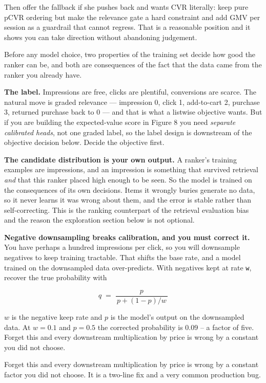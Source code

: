 \documentclass[10pt,twoside]{book}
\newcommand{\csection}[1]{\par\vspace{13pt}\noindent{\sffamily\large\bfseries\color{ink}\raggedright #1\par}\vspace{4pt}}
\newenvironment{mathbox}{\begin{mathboxtc}}{\end{mathboxtc}}
\begin{document}
Then offer the fallback if she pushes back and wants CVR literally: keep pure pCVR ordering but make the relevance gate a hard constraint and add GMV per session as a guardrail that cannot regress. That is a reasonable position and it shows you can take direction without abandoning judgement.\par
\csection{What you are actually training on}
Before any model choice, two properties of the training set decide how good the ranker can be, and both are consequences of the fact that the data came from the ranker you already have.\par
\textbf{The label.} Impressions are free, clicks are plentiful, conversions are scarce. The natural move is graded relevance --- impression 0, click 1, add-to-cart 2, purchase 3, returned purchase back to 0 --- and that is what a listwise objective wants. But if you are building the expected-value score in Figure 8 you need \textit{separate calibrated heads}, not one graded label, so the label design is downstream of the objective decision below. Decide the objective first.\par
\textbf{The candidate distribution is your own output.} A ranker's training examples are impressions, and an impression is something that survived retrieval \textit{and} that this ranker placed high enough to be seen. So the model is trained on the consequences of its own decisions. Items it wrongly buries generate no data, so it never learns it was wrong about them, and the error is stable rather than self-correcting. This is the ranking counterpart of the retrieval evaluation bias and the reason the exploration section below is not optional.\par
\textbf{Negative downsampling breaks calibration, and you must correct it.} You have perhaps a hundred impressions per click, so you will downsample negatives to keep training tractable. That shifts the base rate, and a model trained on the downsampled data over-predicts. With negatives kept at rate \texttt{w}, recover the true probability with\par
\begin{mathbox}\[q \;=\; \frac{p}{\,p + (1-p)/w\,}\]\end{mathbox}
$w$ is the negative keep rate and $p$ is the model's output on the downsampled data. At $w=0.1$ and $p=0.5$ the corrected probability is $0.09$ -- a factor of five. Forget this and every downstream multiplication by price is wrong by a constant you did not choose.\par
Forget this and every downstream multiplication by price is wrong by a constant factor you did not choose. It is a two-line fix and a very common production bug.\par
\end{document}
